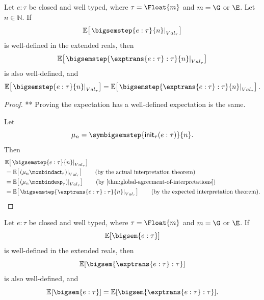 \begin{theorem}
  \label{thm:global-soundness-n-step}
  Let $e:\tau$ be closed and well typed, where
  $\tau=\Float{m}$ and $m=\G$ or $\E$. Let $n\in\mathbb N$. If
  \[
    \mathbb E\!\left[
      \left.\bigsemstep{e:\tau}{n}\right|_{Val_\tau}
    \right]
  \]
  is well-defined in the extended reals, then
  \[
    \mathbb E\!\left[
      \left.
        \bigsemstep{\exptrans{e:\tau}:\tau}{n}
      \right|_{Val_\tau}
    \right]
  \]
  is also well-defined, and
  \[
    \mathbb E\!\left[
      \left.\bigsemstep{e:\tau}{n}\right|_{Val_\tau}
    \right]
    =
    \mathbb E\!\left[
      \left.
        \bigsemstep{\exptrans{e:\tau}:\tau}{n}
      \right|_{Val_\tau}
    \right].
  \]
\end{theorem}

\begin{proof}
  ** Proving the expectation has a well-defined expectation is the same. 

  Let
  \[
    \mu_n
    =
    \symbigsemstep{\mathsf{init}_\tau(e:\tau)}{n}.
  \]
  Then
  \begin{align}
    &\mathbb E\!\left[
      \left.\bigsemstep{e:\tau}{n}\right|_{Val_\tau}
    \right]
    \notag
    \\
    &=
    \mathbb E\!\left[
      \left.(\mu_n\monbind\mathsf{act}_\tau)\right|_{Val_\tau}
    \right]
    \tag{\text{by the actual interpretation theorem}}
    \\
    &=
    \mathbb E\!\left[
      \left.(\mu_n\monbind\mathsf{exp}_\tau)\right|_{Val_\tau}
    \right]
    \tag{\text{by \Cref{thm:global-agreement-of-interpretations}}}
    \\
    &=
    \mathbb E\!\left[
      \left.
        \bigsemstep{\exptrans{e:\tau}:\tau}{n}
      \right|_{Val_\tau}
    \right]
    \tag{\text{by the expected interpretation theorem}}.
  \end{align}
\end{proof}

\begin{theorem}
  \label{thm:global-soundness-big-step}
  Let $e:\tau$ be closed and well typed, where
  $\tau=\Float{m}$ and $m=\G$ or $\E$. If
  \[
    \mathbb E[\bigsem{e:\tau}]
  \]
  is well-defined in the extended reals, then
  \[
    \mathbb E[\bigsem{\exptrans{e:\tau}:\tau}]
  \]
  is also well-defined, and
  \[
    \mathbb E[\bigsem{e:\tau}]
    =
    \mathbb E[\bigsem{\exptrans{e:\tau}:\tau}].
  \]
\end{theorem}

